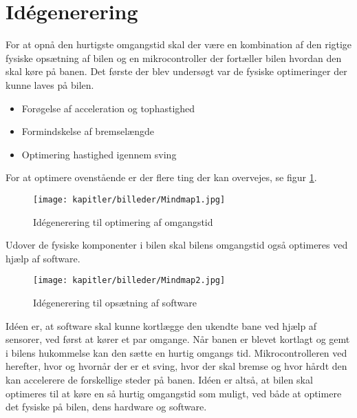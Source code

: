 
\newpage
\section{Idégenerering}
For at opnå den hurtigste omgangstid skal der være en kombination af den rigtige fysiske opsætning af bilen og en mikrocontroller der fortæller bilen hvordan den skal køre på banen.
Det første der blev undersøgt var de fysiske optimeringer der kunne laves på bilen.
\begin{itemize}
\item Forøgelse af acceleration og tophastighed
\item Formindskelse af bremselængde
\item Optimering hastighed igennem sving
\end{itemize}
For at optimere ovenstående er der flere ting der kan overvejes, se figur \ref{fig:mindmap1}.

\begin{figure}[ht]
    \centering
    \texttt{[image: kapitler/billeder/Mindmap1.jpg]}
    \caption{Idégenerering til optimering af omgangstid}
    \label{fig:mindmap1}
\end{figure}

Udover de fysiske komponenter i bilen skal bilens omgangstid også optimeres ved hjælp af software.


\newpage

\begin{figure}[ht]
    \centering
    \texttt{[image: kapitler/billeder/Mindmap2.jpg]}
    \caption{Idégenerering til opsætning af software}
    \label{fig:mindmap2}
\end{figure}


Idéen er, at software skal kunne kortlægge den ukendte bane ved hjælp af sensorer, ved først at kører et par omgange.
Når banen er blevet kortlagt og gemt i bilens hukommelse kan den sætte en hurtig omgangs tid.
Mikrocontrolleren ved herefter, hvor og hvornår der er et sving, hvor der skal bremse og hvor hårdt den kan accelerere de forskellige steder på banen.
Idéen er altså, at bilen skal optimeres til at køre en så hurtig omgangstid som muligt, ved både at optimere det fysiske på bilen, dens hardware og software.
